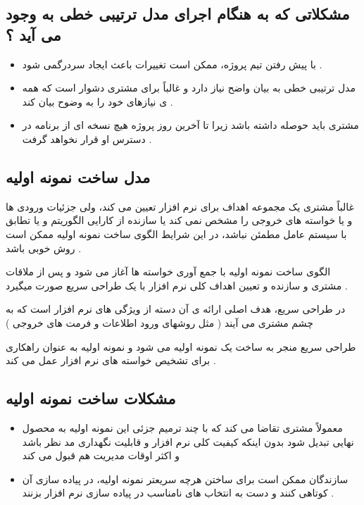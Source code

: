 \documentclass{article}
\begin{document}
\subsection{مشکلاتی که به هنگام اجرای مدل ترتیبی خطی به وجود می آید ؟}

\begin{itemize}
	\item با پیش رفتن تیم پروژه، ممکن است تغییرات باعث ایجاد سردرگمی شود .
	\item مدل ترتیبی خطی به بیان واضح نیاز دارد و غالباً برای مشتری دشوار است که همه ی نیازهای خود را به وضوح بیان کند .
	\item مشتری باید حوصله داشته باشد زیرا تا آخرین روز پروژه هیچ نسخه ای از برنامه در دسترس او قرار نخواهد گرفت .
\end{itemize}



\subsection{مدل ساخت نمونه اولیه}

غالباً مشتری یک مجموعه اهداف برای نرم افزار تعیین می کند، ولی جزئیات ورودی ها و یا خواسته های خروجی را مشخص نمی کند یا سازنده از کارایی الگوریتم و یا تطابق با سیستم عامل مطمئن نباشد، در این شرایط الگوی ساخت نمونه اولیه ممکن است روش خوبی باشد .

الگوی ساخت نمونه اولیه با جمع آوری خواسته ها آغاز می شود و پس از ملاقات مشتری و سازنده و تعیین اهداف کلی نرم افزار با یک طراحی سریع صورت میگیرد .


در طراحی سریع، هدف اصلی ارائه ی آن دسته از ویژگی های نرم افزار است که به چشم مشتری می آیند ( مثل روشهای ورود اطلاعات و فرمت های خروجی )

طراحی سریع منجر به ساخت یک نمونه اولیه می شود و نمونه اولیه به عنوان راهکاری برای تشخیص خواسته های نرم افزار عمل می کند .


\subsection{مشکلات ساخت نمونه اولیه}

\begin{itemize}
	\item معمولاً مشتری تقاضا می کند که با چند ترمیم جزئی این نمونه اولیه به محصول نهایی تبدیل شود بدون اینکه کیفیت کلی نرم افزار و قابلیت نگهداری مد نظر باشد و اکثر اوقات مدیریت هم قبول می کند
	\item سازندگان ممکن است برای ساختن هرچه سریعتر نمونه اولیه، در پیاده سازی آن کوتاهی کنند و دست به انتخاب های نامناسب در پیاده سازی نرم افزار بزنند .
\end{itemize}
\end{document}
